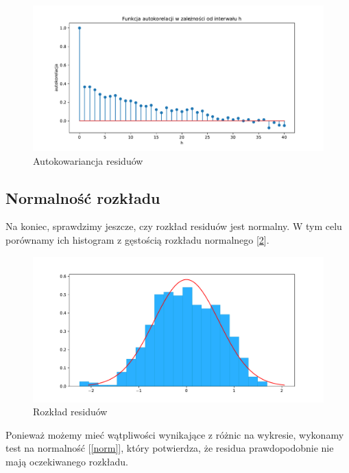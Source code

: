 \documentclass{article}
\theoremstyle{break}
\begin{document}
\begin{figure}[H]
	\begin{center}
		\includegraphics[scale=0.5]{acor.pdf}
		\caption{Autokowariancja residuów}
		\label{fig:acor}
	\end{center}
\end{figure}

\subsection{Normalność rozkładu}

Na koniec, sprawdzimy jeszcze, czy rozkład residuów jest normalny. W tym celu porównamy ich histogram z gęstością rozkładu normalnego [\ref{fig:res_hist}]. 
\begin{figure}[H]
	\begin{center}
		\includegraphics[scale=0.5]{res_hist.pdf}
		\caption{Rozkład residuów}
		\label{fig:res_hist}
	\end{center}
\end{figure}

 Ponieważ możemy mieć wątpliwości wynikające z różnic na wykresie, wykonamy test na normalność [\ref{norm}], który potwierdza, że residua prawdopodobnie nie mają oczekiwanego rozkładu.
\end{document}
